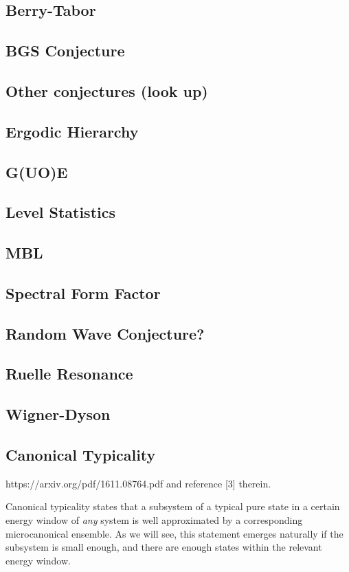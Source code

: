 \subsection{Berry-Tabor}
\subsection{BGS Conjecture}
\subsection{Other conjectures (look up)}
\subsection{Ergodic Hierarchy}
\subsection{G(UO)E}
\subsection{Level Statistics}
\subsection{MBL}
\subsection{Spectral Form Factor}
\subsection{Random Wave Conjecture?}
\subsection{Ruelle Resonance}
\subsection{Wigner-Dyson}



\subsection{Canonical Typicality}
\label{glossary:canonical_typicality}
\cite{} https://arxiv.org/pdf/1611.08764.pdf and reference [3] therein.

Canonical typicality states that a subsystem of a typical pure state in a certain energy window of \textit{any} system is well approximated by a corresponding microcanonical ensemble.
%
As we will see, this statement emerges naturally if the subsystem is small enough, and there are enough states within the relevant energy window.

